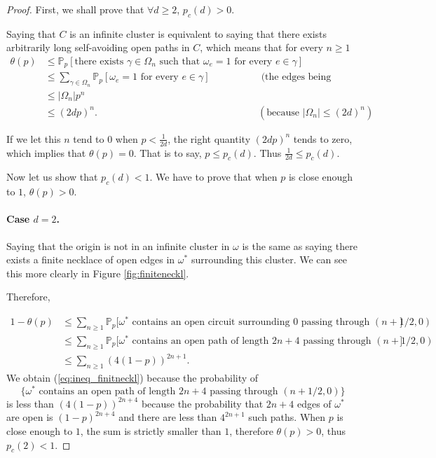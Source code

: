 \documentclass[a4paper,11pt]{article}
\theoremstyle{plain}
\theoremstyle{definition}
\theoremstyle{remark}
\begin{document}
\begin{proof}

First, we shall prove that $\forall d \geq 2$, $p_c(d) > 0$.

Saying that $C$ is an infinite cluster is equivalent to saying that there exists arbitrarily long self-avoiding open paths in $C$, which means that for every $n \geq 1$
\begin{align*} 
\theta(p) &\leq \mathbb{P}_p[ \text{there exists } \gamma \in \Omega_n  \text{ such that } \omega_e = 1  \text{ for every } e \in \gamma] \\
&\leq \sum_{\gamma \in \Omega_n} \mathbb{P}_p[\omega_e = 1 \text{ for every } e \in \gamma] && \text{ (the edges being independants)} \\
&\leq |\Omega_n|p^n \\
&\leq (2dp)^n. && (\text{because $|\Omega_n| \leq (2d)^n$})
\end{align*}

If we let this $n$ tend to $0$ when $p < \frac{1}{2d}$, the right quantity $(2dp)^n$ tends to zero, which implies that $\theta(p) = 0$.
That is to say, $p \leq p_c(d)$. Thus $\frac{1}{2d} \leq p_c(d)$.

Now let us show that $p_c(d) < 1$. We have to prove that when $p$ is close enough to $1$, $\theta(p) > 0$.

\paragraph{Case $d=2$.}
Saying that the origin is not in an infinite cluster in $\omega$ is the same as saying there exists a finite necklace of open edges in $\omega^*$ surrounding this cluster. We can see this more clearly in Figure \ref{fig:finiteneckl}.

Therefore,

\begin{align}
1 - \theta(p) &\leq \sum_{n \geq 1}{\mathbb{P}_p[\omega^* \text{ contains an open circuit surrounding 0 passing through $(n + 1/2, 0)$}}] \nonumber \\
 &\leq \sum_{n \geq 1}{\mathbb{P}_p[\omega^* \text{ contains an open path of length $2n+4$ passing through $(n + 1/2, 0)$}}] \nonumber \\
 &\leq \sum_{n \geq 1}{({4(1-p)})^{2n+1}}. \label{eq:ineq_finitneckl}
\end{align}
We obtain (\ref{eq:ineq_finitneckl}) because the probability of \[\{\omega^* \text{ contains an open path of length $2n+4$ passing through $(n + 1/2, 0)$}\}\]
is less than $(4(1-p))^{2n+4}$ because the probability that $2n+4$ edges of $\omega^*$ are open is $(1-p)^{2n+4}$ and there are less than $4^{2n+1}$ such paths.
When $p$ is close enough to $1$, the sum is strictly smaller than $1$, therefore $\theta(p) > 0$, thus $p_c(2) < 1$.


\end{proof}
\end{document}
